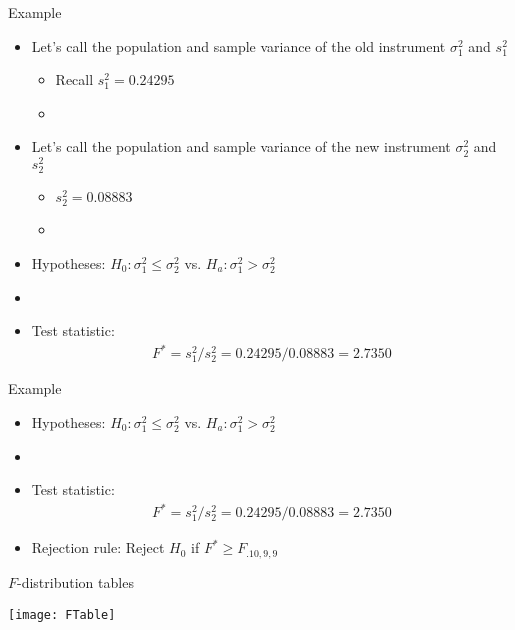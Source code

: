 \documentclass[xcolor=dvipsnames]{beamer}
\begin{document}
\begin{frame}{Example}
	\begin{itemize}
		\item Let's call the population and sample variance of the old instrument $\sigma_1^2$ and $s_1^2$
		\begin{itemize}
			\item Recall $s_1^2 = 0.24295$
			\item[]
		\end{itemize}
		\item Let's call the population and sample variance of the new instrument $\sigma_2^2$ and $s_2^2$
		\begin{itemize}
			\item $s_2^2 = 0.08883$
			\item[]
		\end{itemize}

		\item Hypotheses: $H_0: \sigma_1^2 \leq \sigma_2^2$ vs. $H_a: \sigma_1^2 > \sigma_2^2$
		\item[]
		\item Test statistic:
		\begin{gather*}
		F^* = s_1^2 /s_2^2 = 0.24295 /  0.08883 = 2.7350
		\end{gather*}
	\end{itemize}
\end{frame}

\begin{frame}{Example}
	\begin{itemize}		
		\item Hypotheses: $H_0: \sigma_1^2 \leq \sigma_2^2$ vs. $H_a: \sigma_1^2 > \sigma_2^2$
		\item[]
		\item Test statistic:
		\begin{gather*}
		F^* = s_1^2 /s_2^2 = 0.24295 /  0.08883 = 2.7350
		\end{gather*}
		\item Rejection rule: Reject $H_0$ if $F^* \geq F_{.10, 9, 9}$
	\end{itemize}
\end{frame}

\begin{frame}{$F$-distribution tables}
	\begin{center}
		\texttt{[image: FTable]}
	\end{center}
\end{frame}
\end{document}
